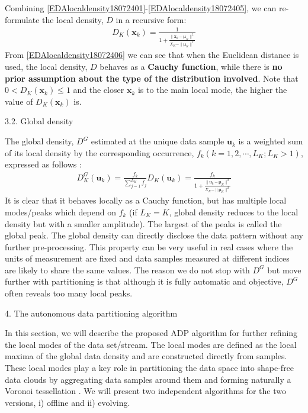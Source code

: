 Combining \eqref{EDAlocaldensity18072401}-\eqref{EDAlocaldensity18072405}, we can re-formulate the local density, $D$ in a recursive form:
\begin{align}\label{EDAlocaldensity18072406}
 D_K(\bm x_k) =\frac 1 {1 + \frac{\|\bm x_k-\bm\mu_K\|^2}{X_K-\|\bm \mu_K\|^2}}
\end{align}
From \eqref{EDAlocaldensity18072406} we can see that when the Euclidean distance is used, the local density, $D$ behaves as a \textbf{Cauchy function}, while there is \textbf{no prior assumption about the type of the distribution involved}. Note that $0 < D_K(\bm x_k) \leq 1$ and the closer $\bm x_k$ is to the main local mode, the higher the value of $D_K(\bm x_k)$ is.

3.2. Global density

The global density, $D^G$ estimated at the unique data sample $\bm u_k$ is a weighted sum of its local density by the corresponding occurrence, $f_k (k = 1, 2, \cdots, L_K;L_K > 1)$, expressed as follows \cite{Angelov2016-7844219,Angelov2017Empirical}:
\begin{align}\label{EDAlocaldensity18072407}
 D^G_K(\bm u_k) = \frac {f_k} {\sum_{j=1}^{L_K} f_j} D_K(\bm u_k) =  \frac {f_k}{1 + \frac{\|\bm u_k-\bm\mu_K\|^2}{X_K-\|\bm \mu_K\|^2}}
\end{align}
It is clear that it behaves locally as a Cauchy function, but has multiple local modes/peaks which depend on $f_k$ (if $L_K = K$, global density reduces to the local density but with a smaller amplitude). The largest of the peaks is called the global peak. The global density can directly disclose the data pattern without any further pre-processing. This property can be very useful in real cases where the units of measurement are fixed and data samples measured at different indices are likely to share the same values. The reason we do not stop with $D^G$ but move further with partitioning is that although it is fully automatic and objective, $D^G$ often reveals too many local peaks.

4. The autonomous data partitioning algorithm

In this section, we will describe the proposed ADP algorithm for further refining the local modes of the data set/stream. The local modes are defined as the local maxima of the global data density and are constructed directly from samples. These local modes play a key role in partitioning the data space into shape-free data clouds \cite{Angelov2012Autonomous,Angelov2014Outside} by aggregating data samples around them and forming naturally a Voronoi tessellation \cite{OkabeBoots2000-5677}. We will present two independent algorithms for the two versions, i) offline and ii) evolving.

